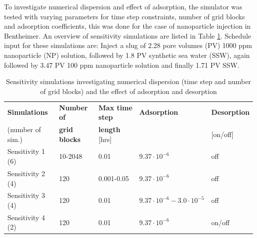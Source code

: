To investigate numerical dispersion and effect of adsorption, the simulator was tested with varying parameters for time step constraints, number of grid blocks and adsorption coefficients, this was done for the case of nanoparticle injection in Bentheimer. An overview of sensitivity simulations are listed in Table \ref{tab:simSensitivity}.
Schedule input for these simulations are: Inject a slug of 2.28 pore volumes (PV) 1000 ppm nanoparticle (NP) solution, followed by 1.8 PV synthetic sea water (SSW), again followed by 3.47 PV 100 ppm nanoparticle solution and finally 1.71 PV SSW. 

\begin{table}[h!]
\small
\centering
\caption{Sensitivity simulations investigating numerical dispersion (time step and number of grid blocks) and the effect of adsorption and desorption}
\label{tab:simSensitivity}
\begin{tabular}{l l l l l } 
\toprule
\footnotesize\textbf{Simulations} & \footnotesize\textbf{Number of} & \footnotesize\textbf{Max time step} & \footnotesize\textbf{Adsorption } & \footnotesize\textbf{Desorption}  \\ 
\scriptsize(number of sim.) & \footnotesize\textbf{grid blocks } & \footnotesize\textbf{length }[hrs]& & [on/off] \\
\midrule 
\scriptsize Sensitivity 1 (6)  & \cellcolor{gray!15}10-2048   & 0.01       & $9.37\cdot10^{-6}$ & off \\
\scriptsize Sensitivity 2 (4)  & 120       & \cellcolor{gray!15}0.001-0.05 & $9.37\cdot10^{-6}$ & off \\ 
\scriptsize Sensitivity 3 (4)  & 120       & 0.01       & \cellcolor{gray!15}\tiny $9.37\cdot10^{-6} -3.0\cdot10^{-
5}$ & off \\ 
\scriptsize Sensitivity 4 (2)  & 120       & 0.01       & $9.37\cdot10^{-6}$ & \cellcolor{gray!15}on/off \\
\bottomrule
\end{tabular}
\end{table}

